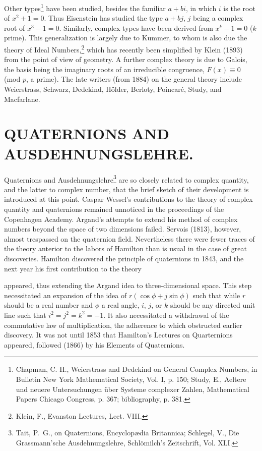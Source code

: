 \documentclass[oneside]{book}
\begin{document}
Other types\footnote{Chapman, C. H., Weierstrass and Dedekind on
General Complex Numbers, in Bulletin New York Mathematical Society,
Vol. I, p. 150; Study, E., Aeltere und neuere Untersuchungen \"uber
Systeme complexer Zahlen, Mathematical Papers Chicago Congress,
p. 367; bibliography, p. 381.} have been studied, besides the
familiar $a + bi$, in which $i$ is the root of $x^2 + 1 = 0$. Thus
Eisenstein has studied the type $a + bj$, $j$ being a complex root
of $x^3 - 1 = 0$. Similarly, complex types have been derived from
$x^k - 1 = 0$ ($k$ prime). This generalization is largely due to
Kummer, to whom is also due the theory of Ideal
Numbers,\footnote{Klein, F., Evanston Lectures, Lect. VIII.} which
has recently been simplified by Klein (1893) from the point of view
of geometry. A further complex theory is due to Galois, the basis
being the imaginary roots of an irreducible congruence, $F(x) \equiv 0$
(mod $p$, a prime). The late writers (from 1884) on the general
theory include Weierstrass, Schwarz, Dedekind, H\"older, Berloty,
Poincar\'e, Study, and Macfarlane.

\chapter{QUATERNIONS AND AUSDEHNUNGSLEHRE.}

Quaternions and Ausdehnungslehre\footnote{Tait, P.~G., on
Quaternions, Encyclop\ae{}dia Britannica; Schlegel, V., Die
Grassmann'sche Ausdehnungslehre, Schl\"omilch's Zeitschrift,
Vol. XLI.} are so closely related to complex quantity, and the
latter to complex number, that the brief sketch of their development
is introduced at this point. Caspar Wessel's contributions to the
theory of complex quantity and quaternions remained unnoticed in
the proceedings of the Copenhagen Academy. Argand's attempts to
extend his method of complex numbers beyond the space of two
dimensions failed. Servois (1813), however, almost trespassed on the
quaternion field. Nevertheless there were fewer traces of the theory
anterior to the labors of Hamilton than is usual in the case of
great discoveries. Hamilton discovered the principle of quaternions
in 1843, and the next year his first contribution to the theory


appeared, thus extending the Argand idea to three-dimensional
space. This step necessitated an expansion of the idea of $r(\cos
\phi + j \sin \phi)$ such that while $r$ should be a real number and
$\phi$ a real angle, $i$, $j$, or $k$ should be any directed unit
line such that $i^2 = j^2 = k^2 = -1$. It also necessitated a
withdrawal of the commutative law of multiplication, the adherence
to which obstructed earlier discovery. It was not until 1853 that
Hamilton's Lectures on Quarternions appeared, followed (1866) by his
Elements of Quaternions.
\end{document}
